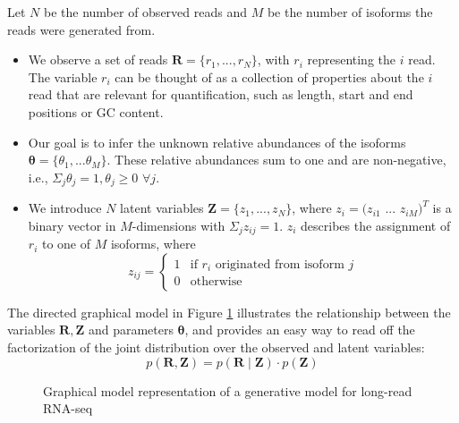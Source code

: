 Let $N$ be the number of observed reads and $M$ be the number of isoforms the reads were generated from. 
\begin{itemize}
    \item We observe a set of reads $\bm{R}=\{r_1,...,r_N\}$, with $r_i$ representing the $i$ read. The variable $r_i$ can be thought of as a collection of properties about the $i$ read that are relevant for quantification, such as length, start and end positions or GC content.
    \item Our goal is to infer the unknown relative abundances of the isoforms $\bm{\theta}=\{\theta_1,...\theta_M\}$. These relative abundances sum to one and are non-negative, i.e., $\Sigma_j\theta_j=1, \theta_j\geq0$ $\forall j$. 
    \item We introduce $N$ latent variables $\bm{Z}=\{z_1,...,z_N\}$, where $z_i=(z_{i1}$ $...$ $z_{iM})^T$ is a binary vector in $M$-dimensions with $\Sigma_jz_{ij}=1$. $z_i$ describes the assignment of $r_i$ to one of $M$ isoforms, where
    \begin{equation}
        z_{ij} = 
        \begin{cases}
        1 & \text{if } r_i \text{ originated from isoform } j\\
        0 & \text{otherwise }
        \end{cases}
    \end{equation}
\end{itemize} 
The directed graphical model in Figure \ref{fig:graphical-model-1} illustrates the relationship between the variables $\bm{R}, \bm{Z}$ and parameters $\bm{\theta}$, and provides an easy way to read off the factorization of the joint distribution over the observed and latent variables:
\begin{equation}
    p(\bm{R},\bm{Z})=p(\bm{R}\mid\bm{Z})\cdot p(\bm{Z})\label{eq:joint-dist}
\end{equation}
\begin{figure}[H]
    \centering
    \caption{Graphical model representation of a generative model for long-read RNA-seq}
    \label{fig:graphical-model-1}
\end{figure}
